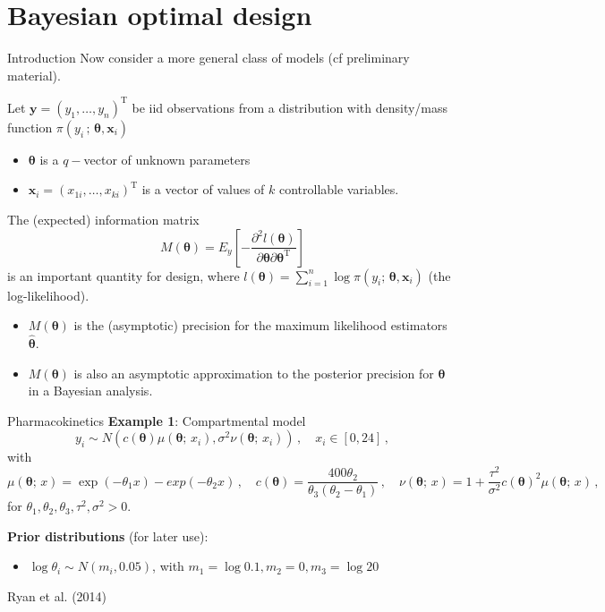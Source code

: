 \documentclass[
  ignorenonframetext,
]{beamer}
\providecommand{\tightlist}{%
  \setlength{\itemsep}{0pt}\setlength{\parskip}{0pt}}
\begin{document}
\hypertarget{bayesian-optimal-design}{%
\section{Bayesian optimal design}\label{bayesian-optimal-design}}

\begin{frame}{Introduction}
\protect\hypertarget{introduction-1}{}
Now consider a more general class of models (cf preliminary material).

Let \(\boldsymbol{y}= (y_1,\ldots,y_n)^\mathrm{T}\) be iid observations
from a distribution with density/mass function
\(\pi(y_i\,;\,\boldsymbol{\theta},\boldsymbol{x}_i)\)

\begin{itemize}
\tightlist
\item
  \(\boldsymbol{\theta}\) is a \(q-\)vector of unknown parameters
\item
  \(\boldsymbol{x}_i =(x_{1i},\ldots,x_{ki})^\mathrm{T}\) is a vector of
  values of \(k\) controllable variables.
\end{itemize}

The (expected) information matrix \[
M(\boldsymbol{\theta}) = E_y\left[-\frac{\partial^2l(\boldsymbol{\theta})}{\partial\boldsymbol{\theta}\partial\boldsymbol{\theta}^\mathrm{T}}\right]
\] is an important quantity for design, where
\(l(\boldsymbol{\theta}) = \sum_{i=1}^n\log\pi(y_i;\,\boldsymbol{\theta},\boldsymbol{x}_i)\)
(the log-likelihood).

\begin{itemize}
\tightlist
\item
  \(M(\boldsymbol{\theta})\) is the (asymptotic) precision for the
  maximum likelihood estimators \(\hat{\boldsymbol{\theta}}\).
\item
  \(M(\boldsymbol{\theta})\) is also an asymptotic approximation to the
  posterior precision for \(\boldsymbol{\theta}\) in a Bayesian
  analysis.
\end{itemize}
\end{frame}

\begin{frame}{Pharmacokinetics}
\protect\hypertarget{pharmacokinetics}{}
\textbf{Example 1}: Compartmental model \[
y_i \sim N\left(c(\boldsymbol{\theta})\mu(\boldsymbol{\theta};\,x_i), \sigma^2\nu(\boldsymbol{\theta};\,x_i)\right)\,,\quad x_i\in[0,24]\,,
\] with \[
\mu(\boldsymbol{\theta};\,x) = \exp(-\theta_1x)-exp(-\theta_2x)\,,\quad c(\boldsymbol{\theta}) = \frac{400\theta_2}{\theta_3(\theta_2-\theta_1)}\,,\quad \nu(\boldsymbol{\theta};\,x) = 1 + \frac{\tau^2}{\sigma^2}c(\boldsymbol{\theta})^2\mu(\boldsymbol{\theta};\,x)\,,
\] for \(\theta_1, \theta_2, \theta_3, \tau^2, \sigma^2>0\).

\textbf{Prior distributions} (for later use):

\begin{itemize}
\tightlist
\item
  \(\log\theta_i\sim N(m_i, 0.05)\), with
  \(m_1 = \log 0.1, m_2 = 0, m_3 = \log 20\)
\end{itemize}

Ryan et al. (2014)
\end{frame}
\end{document}
